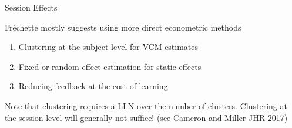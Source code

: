 \documentclass{beamer}
\begin{document}
\begin{frame}{Session Effects }
	\begin{card}
	 Fr\'echette mostly suggests using more direct econometric methods
		\begin{enumerate}
			\item Clustering at the subject level for VCM estimates
			\item Fixed or random-effect estimation for static effects
			\item Reducing feedback at the cost of learning
		\end{enumerate}
		 Note that clustering requires a LLN over the number of clusters. Clustering at the session-level will generally not suffice! (see Cameron and Miller JHR 2017)

\end{card}
\end{frame}
\end{document}
